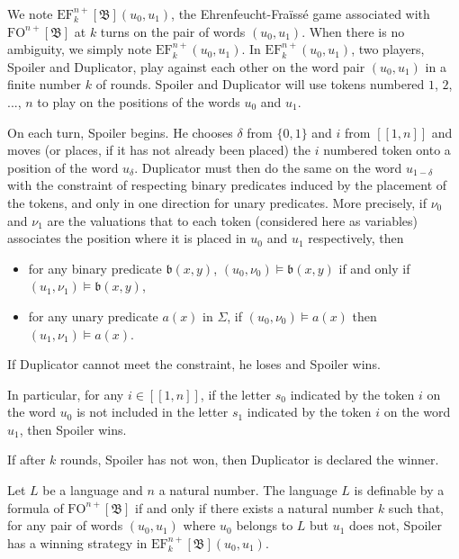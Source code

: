 \documentclass[a4paper,UKenglish,cleveref, autoref, thm-restate]{lipics-v2021}
\newcommand{\FO}{\mathrm{FO}}
\newcommand{\EF}{\mathrm{EF}}
\newcommand{\val}{\nu}
\newcommand{\bin}{\mathfrak{B}}
\renewcommand{\b}{\mathfrak{b}}
\begin{document}
\begin{definition}
    We note $\EF_k^{n+}[\bin](u_0,u_1)$, the Ehrenfeucht-Fraïssé game associated with $\FO^{n+}[\bin]$ at $k$ turns on the pair of words $(u_0,u_1)$. When there is no ambiguity, we simply note $\EF_k^{n+}(u_0,u_1)$. In $\EF_k^{n+}(u_0,u_1)$, two players, Spoiler and Duplicator, play against each other on the word pair $(u_0,u_1)$ in a finite number $k$ of rounds. Spoiler and Duplicator will use tokens numbered $1$, $2$, ..., $n$ to play on the positions of the words $u_0$ and $u_1$.
    
    On each turn, Spoiler begins. He chooses $\delta$ from $\{0,1\}$ and $i$ from $[\![1,n]\!]$ and moves (or places, if it has not already been placed) the $i$ numbered token onto a position of the word $u_{\delta}$. Duplicator must then do the same on the word $u_{1-\delta}$ with the constraint of respecting binary predicates induced by the placement of the tokens, and only in one direction for unary predicates. More precisely, if $\val_0$ and $\val_1$ are the valuations that to each token (considered here as variables) associates the position where it is placed in $u_0$ and $u_1$ respectively, then
    \begin{itemize}
        \item for any binary predicate $\b(x,y)$, $(u_0,\val_0)\models\b(x,y)$ if and only if $(u_1,\val_1)\models\b(x,y)$,
        \item for any unary predicate $a(x)$ in $\Sigma$, if $(u_0,\val_0)\models a(x)$ then $(u_1,\val_1)\models a(x)$.
    \end{itemize}
    
    If Duplicator cannot meet the constraint, he loses and Spoiler wins.

    In particular, for any $i\in[\![1,n]\!]$, if the letter $s_0$ indicated by the token $i$ on the word $u_0$ is not included in the letter $s_1$ indicated by the token $i$ on the word $u_1$, then Spoiler wins.

    If after $k$ rounds, Spoiler has not won, then Duplicator is declared the winner.
\end{definition}






\begin{theorem} \label{EF2+}
    Let $L$ be a language and $n$ a natural number. The language $L$ is definable by a formula of $\FO^{n+}[\bin]$ if and only if there exists a natural number $k$ such that, for any pair of words $(u_0,u_1)$ where $u_0$ belongs to $L$ but $u_1$ does not, Spoiler has a winning strategy in $\EF_k^{n+}[\bin](u_0,u_1)$.
\end{theorem}
\end{document}
